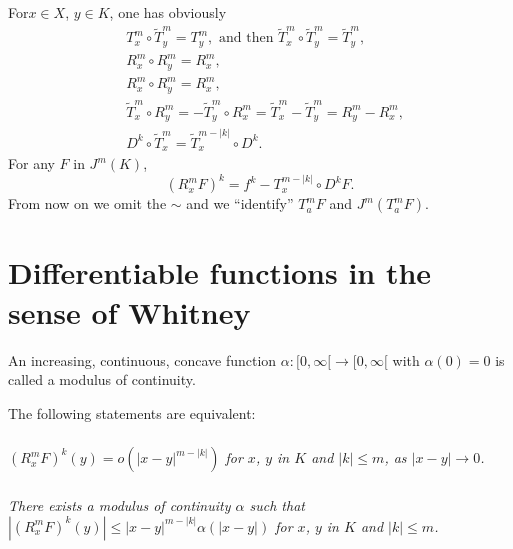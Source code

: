 For\pageoriginale $x\in X$, $y\in K$, one has obviously
\begin{align}
& T^{m}_{x}\circ \widetilde{T}^{m}_{y}=T^{m}_{y},\text{ and then } \widetilde{T}^{m}_{x}\circ \widetilde{T}^{m}_{y}=\widetilde{T}^{m}_{y},\label{chap1-eq1.1}\\
& R^{m}_{x}\circ R^{m}_{y}=R^{m}_{x},\label{chap1-eq1.2}\\
& R^{m}_{x}\circ R^{m}_{y}=R^{m}_{x},\label{chap1-eq1.3}\\
& \widetilde{T}^{m}_{x}\circ R^{m}_{y}=-\widetilde{T}^{m}_{y}\circ R^{m}_{x}=\widetilde{T}^{m}_{x}-\widetilde{T}^{m}_{y}=R^{m}_{y}-R^{m}_{x},\label{chap1-eq1.4}\\
& D^{k}\circ \widetilde{T}^{m}_{x}=\widetilde{T}^{m-|k|}_{x}\circ D^{k}.\label{chap1-eq1.5}
\end{align}
For any $F$ in $J^{m}(K)$,
\begin{equation}
(R^{m}_{x}F)^{k}=f^{k}-T^{m-|k|}_{x}\circ D^{k}F.\label{chap1-eq1.6}
\end{equation}
From now on we omit the $\sim$ and we ``identify'' $T^{m}_{a}F$ and $J^{m}(T^{m}_{a}F)$.

\section{Differentiable functions in the sense of Whitney}\label{chap1-sec2}

\begin{definition}\label{chap1-defi2.1}
An increasing, continuous, concave function $\alpha:[0,\infty[\to [0,\infty[$ with $\alpha(0)=0$ is called a modulus of continuity.
\end{definition}

\begin{theorem}\label{chap1-thm2.2}
The following statements are equivalent:
\end{theorem}

\setcounter{subsection}{2}
\subsubsection{}\label{chap1-sec2.2.1}
{\em $(R^{m}_{x}F)^{k}(y)=o(|x-y|^{m-|k|})$ for $x$, $y$ in $K$ and $|k|\leq m$, as $|x-y|\to 0$.}

\subsubsection{}\label{chap1-sec2.2.2}
{\em There exists a modulus of continuity $\alpha$ such that $|(R^{m}_{x}F)^{k}(y)|\leq |x-y|^{m-|k|}\alpha(|x-y|)$ for $x$, $y$ in $K$ and $|k|\leq m$.}

